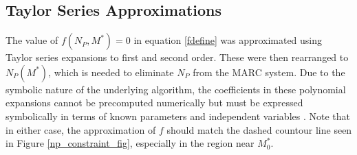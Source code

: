 \documentclass{ansconf}
\begin{document}
\subsection{Taylor Series Approximations}
\label{sec:aproxmeth}

The value of $f(N_P,M^*)=0$ in equation \ref{fdefine} was approximated using 
Taylor series expansions to first and second order.  These were then rearranged to 
$N_P(M^*)$, which is needed to eliminate $N_P$ from the MARC system.  
Due to the symbolic nature of the underlying algorithm, the coefficients in these
polynomial expansions cannot be precomputed numerically but must be 
expressed symbolically in terms of known parameters and independent variables 
\cite{Sacks:1989:ASS:1623755.1623823}.
Note that in 
either case, the approximation of $f$ should match the dashed countour line seen in 
Figure \ref{np_constraint_fig}, especially in the region near $M_0^*$.
\end{document}
